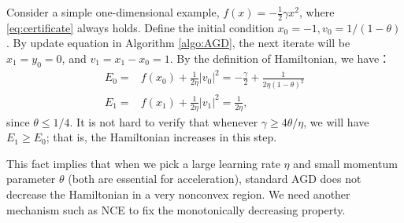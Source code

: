 Consider a simple one-dimensional example, $f(x) = -\frac{1}{2}\gamma x^2$, where \eqref{eq:certificate} always holds. Define the initial condition $x_0 = -1, v_0 = 1/(1-\theta)$. By update equation in Algorithm \ref{algo:AGD}, the next iterate will be $x_1 = y_0 = 0$, and $v_1 = x_1 - x_0 = 1$. By the definition of Hamiltonian, we have：
\begin{align*}
E_0 =& f(x_0) + \frac{1}{2\eta}|v_0|^2 = -\frac{\gamma}{2} + \frac{1}{2\eta (1-\theta)^2}\\
E_1 =& f(x_1) + \frac{1}{2\eta}|v_1|^2 = \frac{1}{2\eta},
\end{align*}
since $\theta \le 1/4$. It is not hard to verify that whenever $\gamma \ge 4 \theta/\eta$, we will have $E_1 \ge E_0$; that is, the Hamiltonian increases in this step.

This fact implies that when we pick a large learning rate $\eta$ and small momentum parameter $\theta$ (both are essential for acceleration), standard AGD does not decrease the Hamiltonian in a very nonconvex region. We need another mechanism such as NCE to fix the monotonically decreasing property.
